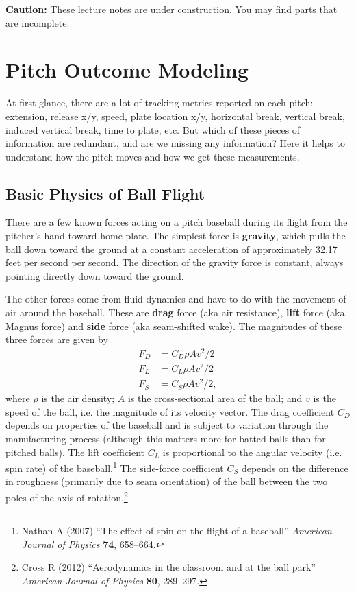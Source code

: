 \documentclass{article}
\begin{document}
\begin{framed}
  {\bf Caution:} These lecture notes are under construction. You may find parts that are incomplete.
\end{framed}

\setcounter{section}{4}
\section{\sc Pitch Outcome Modeling}

  At first glance, there are a lot of tracking metrics reported on each pitch: extension, release x/y, speed, plate location x/y, horizontal break, vertical break, induced vertical break, time to plate, etc. But which of these pieces of information are redundant, and are we missing any information? Here it helps to understand how the pitch moves and how we get these measurements.

  \subsection{\sc Basic Physics of Ball Flight}

    There are a few known forces acting on a pitch baseball during its flight from the pitcher's hand toward home plate. The simplest force is {\bf gravity}, which pulls the ball down toward the ground at a constant acceleration of approximately 32.17 feet per second per second. The direction of the gravity force is constant, always pointing directly down toward the ground.

    The other forces come from fluid dynamics and have to do with the movement of air around the baseball. These are {\bf drag} force (aka air resistance), {\bf lift} force (aka Magnus force) and {\bf side} force (aka seam-shifted wake). The magnitudes of these three forces are given by
    \begin{align*}
      F_D &= C_D \rho A v^2 / 2\\
      F_L &= C_L \rho A v^2 / 2\\
      F_S &= C_S \rho A v^2 / 2,
    \end{align*}
    where $\rho$ is the air density; $A$ is the cross-sectional area of the ball; and $v$ is the speed of the ball, i.e. the magnitude of its velocity vector. The drag coefficient $C_D$ depends on properties of the baseball and is subject to variation through the manufacturing process (although this matters more for batted balls than for pitched balls). The lift coefficient $C_L$ is proportional to the angular velocity (i.e. spin rate) of the baseball.\footnote{Nathan A (2007) ``The effect of spin on the flight of a baseball'' {\it American Journal of Physics} {\bf 74}, 658--664.} The side-force coefficient $C_S$ depends on the difference in roughness (primarily due to seam orientation) of the ball between the two poles of the axis of rotation.\footnote{Cross R (2012) ``Aerodynamics in the classroom and at the ball park'' {\it American Journal of Physics} {\bf 80}, 289--297.}
    
\end{document}
